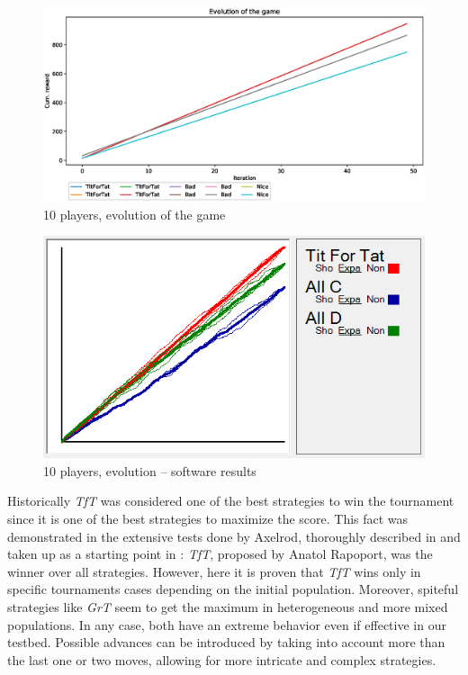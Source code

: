 \documentclass[journal,10pt,twoside]{IEEEtran}
\begin{document}
\begin{figure}[!ht]
    \centering
    \includegraphics[width=1\columnwidth]{../img/ipdmp/ipdmp-evolution-of-game-10}
    \caption{10 players, evolution of the game}
    \label{fig:ipdmp10evo}
\end{figure}

\begin{figure}[!ht]
    \centering
    \includegraphics[width=.8\columnwidth]{../img/ipdmp/ipdmp10-plot-det}
    \caption{10 players, evolution -- software results \cite{demosw}}
    \label{fig:ipdmp10evosw}
\end{figure}

Historically \textit{TfT} was considered one of the best strategies to win the tournament since it is one of the best strategies to maximize the score.
This fact was demonstrated in the extensive tests done by Axelrod, thoroughly described in \cite{axelrod1981evolution,axelrod1984evolution} and taken up as a starting point in \cite{mathieu2017}: \textit{TfT}, proposed by Anatol Rapoport, was the winner over all strategies.
However, here it is proven that \textit{TfT} wins only in specific tournaments cases depending on the initial population. Moreover, spiteful strategies like \textit{GrT} seem to get the maximum in heterogeneous and more mixed populations. In any case, both have an extreme behavior even if effective in our testbed. Possible advances can be introduced by taking into account more than the last one or two moves, allowing for more intricate and complex strategies.~\cite{mathieu2017}
\end{document}
